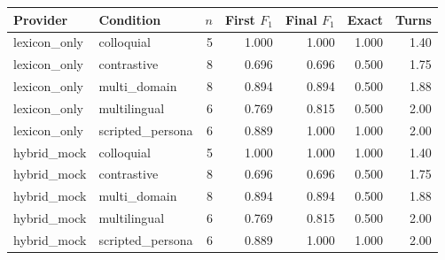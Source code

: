 \begin{tabular}{llrrrrr}
\toprule
Provider & Condition & $n$ & First $F_1$ & Final $F_1$ & Exact & Turns \\
\midrule
lexicon\_only & colloquial & 5 & 1.000 & 1.000 & 1.000 & 1.40 \\
lexicon\_only & contrastive & 8 & 0.696 & 0.696 & 0.500 & 1.75 \\
lexicon\_only & multi\_domain & 8 & 0.894 & 0.894 & 0.500 & 1.88 \\
lexicon\_only & multilingual & 6 & 0.769 & 0.815 & 0.500 & 2.00 \\
lexicon\_only & scripted\_persona & 6 & 0.889 & 1.000 & 1.000 & 2.00 \\
hybrid\_mock & colloquial & 5 & 1.000 & 1.000 & 1.000 & 1.40 \\
hybrid\_mock & contrastive & 8 & 0.696 & 0.696 & 0.500 & 1.75 \\
hybrid\_mock & multi\_domain & 8 & 0.894 & 0.894 & 0.500 & 1.88 \\
hybrid\_mock & multilingual & 6 & 0.769 & 0.815 & 0.500 & 2.00 \\
hybrid\_mock & scripted\_persona & 6 & 0.889 & 1.000 & 1.000 & 2.00 \\
\bottomrule
\end{tabular}
